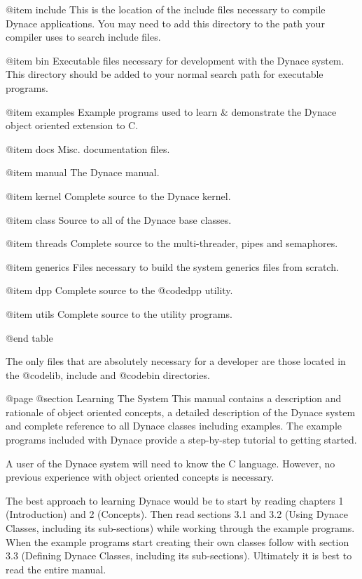 @item include
This is the location of the include files necessary to compile Dynace
applications.  You may need to add this directory to the path your
compiler uses to search include files.

@item bin
Executable files necessary for development with the Dynace system.
This directory should be added to your normal search path for executable
programs.

@item examples
Example programs used to learn & demonstrate the Dynace object oriented
extension to C.

@item docs
Misc. documentation files.

@item manual
The Dynace manual.

@item kernel
Complete source to the Dynace kernel.

@item class
Source to all of the Dynace base classes.

@item threads
Complete source to the multi-threader, pipes and semaphores.

@item generics
Files necessary to build the system generics files from scratch.

@item dpp
Complete source to the @code{dpp} utility.

@item utils
Complete source to the utility programs.

@end table



The only files that are absolutely necessary for a developer are those
located in the @code{lib, include} and @code{bin}
directories.




@page
@section Learning The System
This manual contains a description and rationale of object oriented
concepts, a detailed description of the Dynace system and complete
reference to all Dynace classes including examples.  The example programs
included with Dynace provide a step-by-step tutorial to getting started.

A user of the Dynace system will need to know the C language.  However,
no previous experience with object oriented concepts is necessary.

The best approach to learning Dynace would be to start by reading
chapters 1 (Introduction) and 2 (Concepts).  Then read sections 3.1 and
3.2 (Using Dynace Classes, including its sub-sections) while working
through the example programs.  When the example programs start creating
their own classes follow with section 3.3 (Defining Dynace Classes,
including its sub-sections).  Ultimately it is best to read the entire
manual.

